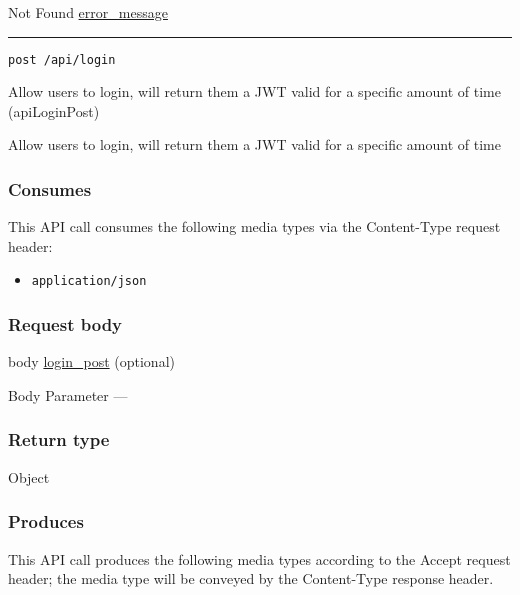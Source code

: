 Not Found \protect\hyperlink{error_message}{error\_message}

\begin{center}\rule{0.5\linewidth}{\linethickness}\end{center}

\protect\hypertarget{apiLoginPost}{}{}

\begin{verbatim}
post /api/login
\end{verbatim}

Allow users to login, will return them a JWT valid for a specific amount
of time ({apiLoginPost})

Allow users to login, will return them a JWT valid for a specific amount
of time

\hypertarget{consumes-38}{%
\subsubsection{Consumes}\label{consumes-38}}

This API call consumes the following media types via the {Content-Type}
request header:

\begin{itemize}
\tightlist
\item
  \texttt{application/json}
\end{itemize}

\hypertarget{request-body-38}{%
\subsubsection{Request body}\label{request-body-38}}

body \protect\hyperlink{login_post}{login\_post} (optional)

{Body Parameter} ---

\hypertarget{return-type-93}{%
\subsubsection{Return type}\label{return-type-93}}

Object

\hypertarget{produces-120}{%
\subsubsection{Produces}\label{produces-120}}

This API call produces the following media types according to the
{Accept} request header; the media type will be conveyed by the
{Content-Type} response header.

